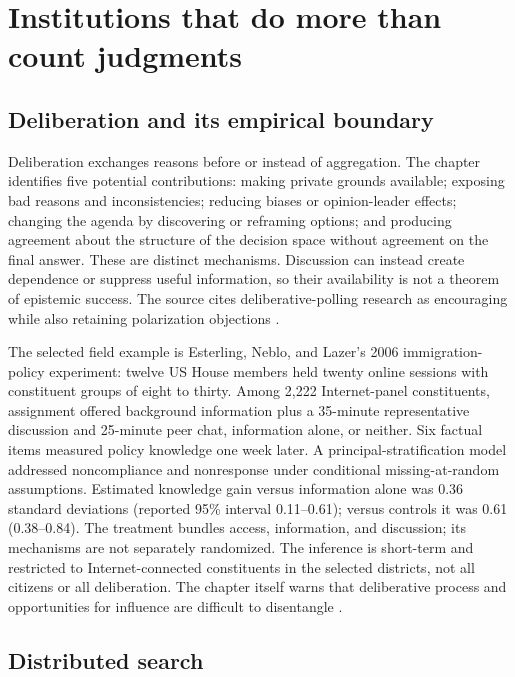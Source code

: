 \section{Institutions that do more than count judgments}
\label{sec:p18-r101-institutions}

\subsection{Deliberation and its empirical boundary}

Deliberation exchanges reasons before or instead of aggregation. The
chapter identifies five potential contributions: making private grounds
available; exposing bad reasons and inconsistencies; reducing biases or
opinion-leader effects; changing the agenda by discovering or reframing
options; and producing agreement about the structure of the decision
space without agreement on the final answer. These are distinct
mechanisms. Discussion can instead create dependence or suppress useful
information, so their availability is not a theorem of epistemic success.
The source cites deliberative-polling research as encouraging while also
retaining polarization objections
\parencite[p.~584]{DietrichSpiekermann2021Social}.

The selected field example is Esterling, Neblo, and Lazer's 2006
immigration-policy experiment: twelve US House members held twenty
online sessions with constituent groups of eight to thirty. Among
2,222 Internet-panel constituents, assignment offered background
information plus a 35-minute representative discussion and 25-minute
peer chat, information alone, or neither. Six factual items measured
policy knowledge one week later. A principal-stratification model
addressed noncompliance and nonresponse under conditional
missing-at-random assumptions. Estimated knowledge gain versus
information alone was 0.36 standard deviations (reported 95\% interval
0.11--0.61); versus controls it was 0.61 (0.38--0.84).
The treatment bundles access, information, and discussion; its mechanisms
are not separately randomized. The inference is short-term and restricted
to Internet-connected constituents in the selected districts, not all
citizens or all deliberation. The chapter itself warns that deliberative
process and opportunities for influence are difficult to disentangle
\parencite[pp.~485--495, 497--500]{EsterlingNebloLazer2011Informed}
\parencite[p.~584]{DietrichSpiekermann2021Social}.

\subsection{Distributed search}

